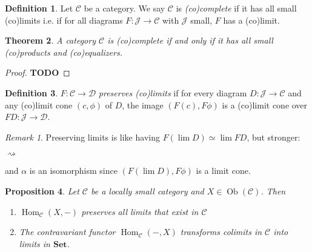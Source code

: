 \documentclass{article}
\newcommand{\cat}{\mathcal{C}}
\newcommand{\catt}{\mathcal{D}}
\newcommand{\Jcat}{\mathcal{J}}
\newcommand{\Set}{\mathbf{Set}}
\DeclareMathOperator{\Ob}{Ob}
\DeclareMathOperator{\Hom}{Hom}
\newcommand{\todo}{\textbf{TODO}}
\theoremstyle{plain}
\newtheorem{theorem}{Theorem}[section]
\newtheorem{proposition}[theorem]{Proposition}
\theoremstyle{definition}
\newtheorem{definition}[theorem]{Definition}
\theoremstyle{remark}
\newtheorem*{remark}{Remark}
\begin{document}
\begin{definition}
    Let $\cat$ be a category. We say $\cat$ is \emph{(co)complete} if it has all small (co)limits i.e. if for all diagrams $F : \Jcat \to \cat$ with $\Jcat$ small, $F$ has a (co)limit.
\end{definition}

\begin{theorem}
    A category $\cat$ is (co)complete if and only if it has all small (co)products and (co)equalizers.
\end{theorem}

\begin{proof}
    \todo
\end{proof}

\begin{definition}
    $F : \cat \to \catt$ \emph{preserves (co)limits} if for every diagram $D : \Jcat \to \cat$ and any (co)limit cone $(c,\phi)$ of $D$, the image $(F(c),F\phi)$ is a (co)limit cone over $FD : \Jcat \to \catt$.
\end{definition}

\begin{remark}
    Preserving limits is like having $F(\lim D) \simeq \lim FD$, but stronger:
    \begin{center}
        \hspace{2em}$\rightsquigarrow$\hspace{2em}
    \end{center}
    and $\alpha$ is an isomorphism since $(F(\lim D), F\phi)$ is a limit cone.
\end{remark}

\begin{proposition}
    Let $\cat$ be a locally small category and $X \in \Ob(\cat)$. Then
    \begin{enumerate}
        \item $\Hom_\cat (X,-)$ preserves all limits that exist in $\cat$
        \item The contravariant functor $\Hom_\cat(-,X)$ transforms colimits in $\cat$ into limits in $\Set$.
    \end{enumerate}
\end{proposition}
\end{document}
